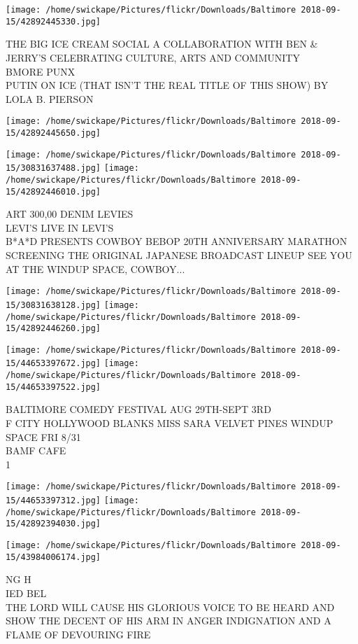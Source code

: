 \documentclass[10pt,letterpaper]{article}
\begin{document}
\texttt{[image: /home/swickape/Pictures/flickr/Downloads/Baltimore 2018-09-15/42892445330.jpg]}

THE BIG ICE CREAM SOCIAL A COLLABORATION WITH BEN \& JERRY'S CELEBRATING CULTURE, ARTS AND COMMUNITY\\
BMORE PUNX\\
PUTIN ON ICE (THAT ISN'T THE REAL TITLE OF THIS SHOW) BY LOLA B. PIERSON
\pagebreak

\texttt{[image: /home/swickape/Pictures/flickr/Downloads/Baltimore 2018-09-15/42892445650.jpg]}

\vspace{0.25in}
\texttt{[image: /home/swickape/Pictures/flickr/Downloads/Baltimore 2018-09-15/30831637488.jpg]}
\texttt{[image: /home/swickape/Pictures/flickr/Downloads/Baltimore 2018-09-15/42892446010.jpg]}

ART 300,00 DENIM LEVIES\\
LEVI'S LIVE IN LEVI'S\\
B*A*D PRESENTS COWBOY BEBOP 20TH ANNIVERSARY MARATHON SCREENING THE ORIGINAL JAPANESE BROADCAST LINEUP SEE YOU AT THE WINDUP SPACE, COWBOY...
\pagebreak

\texttt{[image: /home/swickape/Pictures/flickr/Downloads/Baltimore 2018-09-15/30831638128.jpg]}
\texttt{[image: /home/swickape/Pictures/flickr/Downloads/Baltimore 2018-09-15/42892446260.jpg]}

\texttt{[image: /home/swickape/Pictures/flickr/Downloads/Baltimore 2018-09-15/44653397672.jpg]}
\texttt{[image: /home/swickape/Pictures/flickr/Downloads/Baltimore 2018-09-15/44653397522.jpg]}

BALTIMORE COMEDY FESTIVAL AUG 29TH{-}SEPT 3RD\\
F CITY HOLLYWOOD BLANKS MISS SARA VELVET PINES WINDUP SPACE FRI 8/31\\
BAMF CAFE\\
1
\pagebreak

\texttt{[image: /home/swickape/Pictures/flickr/Downloads/Baltimore 2018-09-15/44653397312.jpg]}
\texttt{[image: /home/swickape/Pictures/flickr/Downloads/Baltimore 2018-09-15/42892394030.jpg]}

\vspace{0.25in}
\texttt{[image: /home/swickape/Pictures/flickr/Downloads/Baltimore 2018-09-15/43984006174.jpg]}

NG H\\
IED BEL\\
THE LORD WILL CAUSE HIS GLORIOUS VOICE TO BE HEARD AND SHOW THE DECENT OF HIS ARM IN ANGER INDIGNATION AND A FLAME OF DEVOURING FIRE
\pagebreak
\end{document}

